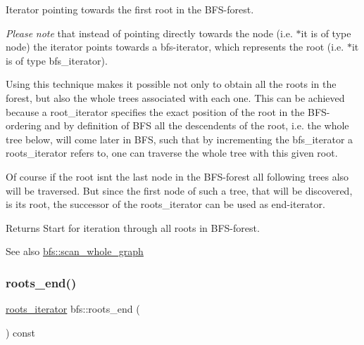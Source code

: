 Iterator pointing towards the first root in the B\+F\+S-\/forest. 

{\itshape Please} {\itshape note} that instead of pointing directly towards the node (i.\+e. {\ttfamily $\ast$it} is of type {\ttfamily node}) the iterator points towards a bfs-\/iterator, which represents the root (i.\+e. {\ttfamily $\ast$it} is of type {\ttfamily bfs\+\_\+iterator}).

Using this technique makes it possible not only to obtain all the roots in the forest, but also the whole trees associated with each one. This can be achieved because a {\ttfamily root\+\_\+iterator} specifies the exact position of the root in the B\+F\+S-\/ordering and by definition of B\+FS all the descendents of the root, i.\+e. the whole tree below, will come later in B\+FS, such that by incrementing the {\ttfamily bfs\+\_\+iterator} a {\ttfamily roots\+\_\+iterator} refers to, one can traverse the whole tree with this given root.

Of course if the root isn\textquotesingle{}t the last node in the B\+F\+S-\/forest all following trees also will be traversed. But since the first node of such a tree, that will be discovered, is its root, the successor of the {\ttfamily roots\+\_\+iterator} can be used as end-\/iterator.

\begin{DoxyReturn}{Returns}
Start for iteration through all roots in B\+F\+S-\/forest. 
\end{DoxyReturn}
\begin{DoxySeeAlso}{See also}
\mbox{\hyperlink{classbfs_a25fc51b1bfbbdd3afefe0a84c1bd2f6b}{bfs\+::scan\+\_\+whole\+\_\+graph}} 
\end{DoxySeeAlso}
\mbox{\label{classbfs_ac84b90f777adeb90390689db62602d73}} 
\subsubsection{\texorpdfstring{roots\+\_\+end()}{roots\_end()}}
{\footnotesize\ttfamily \mbox{\hyperlink{classbfs_a386ac6f3c63e38c3f5263e15c3ab9d01}{roots\+\_\+iterator}} bfs\+::roots\+\_\+end (\begin{DoxyParamCaption}{ }\end{DoxyParamCaption}) const\hspace{0.3cm}{\ttfamily [inline]}}



